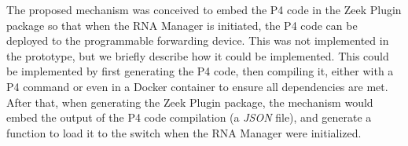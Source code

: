 The proposed mechanism was conceived to embed the P4 code in the Zeek Plugin package so that when the RNA Manager is initiated, the P4 code can be deployed to the programmable forwarding device. This was not implemented in the prototype, but we briefly describe how it could be implemented. This could be implemented by first generating the P4 code, then compiling it, either with a P4 command or even in a Docker container to ensure all dependencies are met. After that, when generating the Zeek Plugin package, the mechanism would embed the output of the P4 code compilation (a \textit{JSON} file), and generate a function to load it to the switch when the RNA Manager were initialized.

